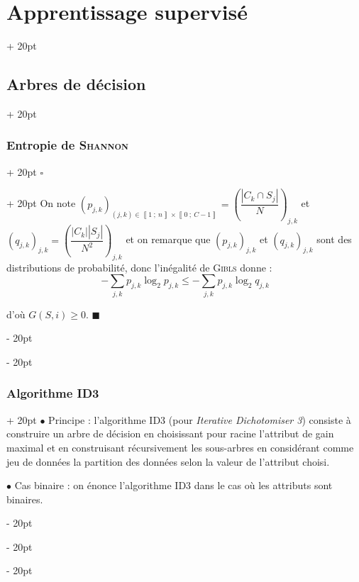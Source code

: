 \documentclass[a4paper, 12pt, twoside]{article}
\newenvironment{indalgo}[2][H]{
    \begin{algoBox}
        \begin{algorithm}[#1]
            \caption{#2}
}
{
        \end{algorithm}
    \end{algoBox}
}
\newcommand{\nset}[2]{\left\llbracket #1\ ;\ #2 \right\rrbracket}
\newcommand{\lr}[1]{\left( #1 \right)}
\newcommand{\abs}[1]{\left\lvert #1 \right\rvert}
\renewcommand{\le}{\leqslant}
\renewcommand{\ge}{\geqslant}
\newcommand{\ind}[1][20pt]{\advance\leftskip + #1}
\newcommand{\deind}[1][20pt]{\advance\leftskip - #1}
\newenvironment{indt}[2][20pt]{#2 \par \ind[#1]}{\par \deind} %
\newenvironment{proof}[1][{}]{\begin{indt}{$\square$ #1}}{$\blacksquare$ \end{indt}}
\begin{document}
\begin{indt}{\section{Apprentissage supervisé}}
\begin{indt}{\subsection{Arbres de décision}}
\begin{indt}{\subsubsection{Entropie de \textsc{Shannon}}}
\begin{proof}
                    On note $\displaystyle \lr{p_{j, k}}_{(j, k) \in \nset 1 n \times \nset 0 {C - 1}} = \lr{\dfrac{\abs{C_k \cap S_j}}{N}}_{j, k}$
                    et $\displaystyle \lr{q_{j, k}}_{j, k} = \lr{\dfrac{\abs{C_k} \abs{S_j}}{N^2}}_{j, k}$
                    et on remarque que $\lr{p_{j, k}}_{j, k}$ et $\lr{q_{j, k}}_{j, k}$ sont des distributions de probabilité, donc l'inégalité de \textsc{Gibls} donne :
                    \[
                        - \sum_{j, k} p_{j, k} \log_2 p_{j, k}
                        \le
                        - \sum_{j, k} p_{j, k}\log_2 q_{j, k}
                    \]

                    d'où $G(S, i) \ge 0$.
                \end{proof}
            \end{indt}

            \vspace{12pt}
            
            \begin{indt}{\subsubsection{Algorithme ID3}}
                $\bullet$ Principe : l'algorithme ID3 (pour \textit{Iterative Dichotomiser 3}) consiste à construire un arbre de décision en choisissant pour racine l'attribut de gain maximal et en construisant récursivement les sous-arbres en considérant comme jeu de données la partition des données selon la valeur de l'attribut choisi.

                \vspace{12pt}
                
                $\bullet$ Cas binaire : on énonce l'algorithme ID3 dans le cas où les attributs sont binaires.

                \begin{indalgo}{ID3, cas binaire}

                    \BlankLine

\end{indalgo}
\end{indt}
\end{indt}
\end{indt}
\end{document}
